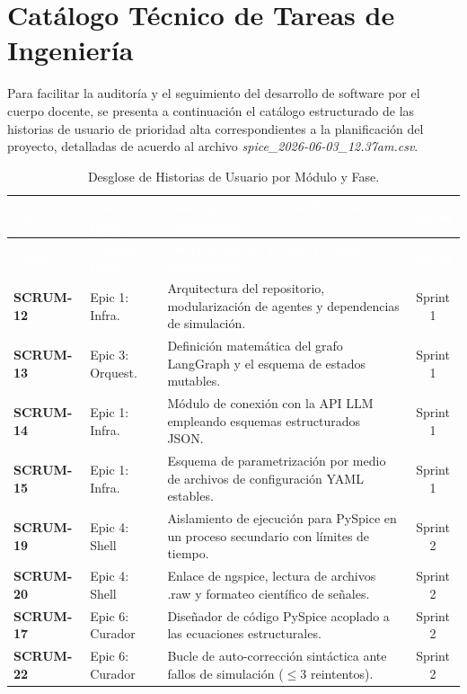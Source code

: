 \documentclass[12pt,letterpaper,oneside]{report}
\begin{document}
\clearpage

\chapter{Catálogo Técnico de Tareas de Ingeniería}

Para facilitar la auditoría y el seguimiento del desarrollo de software por el cuerpo docente, se presenta a continuación el catálogo estructurado de las historias de usuario de prioridad alta correspondientes a la planificación del proyecto, detalladas de acuerdo al archivo \textit{spice\_2026-06-03\_12.37am.csv}.

\begin{xltabular}{\textwidth}{l p{2.8cm} >{\raggedright\arraybackslash}X c}
\caption{Desglose de Historias de Usuario por Módulo y Fase.} \label{tab:catalogo_historias} \\
\toprule
{}
\textcolor{white}{\textbf{Clave}} & \textcolor{white}{\textbf{Módulo (Epic)}} & \textcolor{white}{\textbf{Descripción de Tareas Técnicas y Funcionales}} & \textcolor{white}{\textbf{Sprint}} \\
\endfirsthead
\toprule
{}
\textcolor{white}{\textbf{Clave}} & \textcolor{white}{\textbf{Módulo (Epic)}} & \textcolor{white}{\textbf{Descripción de Tareas Técnicas y Funcionales}} & \textcolor{white}{\textbf{Sprint}} \\
\midrule
\endhead
\bottomrule
\endfoot

\midrule
{}
\textbf{SCRUM-12} & Epic 1: Infra. & Arquitectura del repositorio, modularización de agentes y dependencias de simulación. & Sprint 1 \\
\textbf{SCRUM-13} & Epic 3: Orquest. & Definición matemática del grafo LangGraph y el esquema de estados mutables. & Sprint 1 \\
\textbf{SCRUM-14} & Epic 1: Infra. & Módulo de conexión con la API LLM empleando esquemas estructurados JSON. & Sprint 1 \\
\textbf{SCRUM-15} & Epic 1: Infra. & Esquema de parametrización por medio de archivos de configuración YAML estables. & Sprint 1 \\

\textbf{SCRUM-19} & Epic 4: Shell & Aislamiento de ejecución para PySpice en un proceso secundario con límites de tiempo. & Sprint 2 \\
\textbf{SCRUM-20} & Epic 4: Shell & Enlace de ngspice, lectura de archivos .raw y formateo científico de señales. & Sprint 2 \\
\textbf{SCRUM-17} & Epic 6: Curador & Diseñador de código PySpice acoplado a las ecuaciones estructurales. & Sprint 2 \\
\textbf{SCRUM-22} & Epic 6: Curador & Bucle de auto-corrección sintáctica ante fallos de simulación ($\le 3$ reintentos). & Sprint 2 \\


\end{xltabular}
\end{document}
